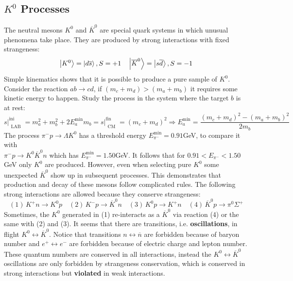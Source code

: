 \documentclass[10.75pt,a4paper,openright,bottom=2cm]{article}
\begin{document}
\subsection{$K^0$ Processes}
The neutral mesons $K^0$ and $\overline{K}^0$ are special quark systems in which unusual phenomena take place. They are produced by strong interactions with fixed strangeness:
\[
\ket{K^0}=\ket{d\overline{s}}, S=+1 \quad \ket{\overline{K}^0}=\ket{s\overline{d}}, S=-1
\]
Simple kinematics shows that it is possible to produce a pure sample of $K^0$. Consider the reaction $ab\to cd$, if $(m_c+m_d)>(m_a+m_b)$ it requires some kinetic energy to happen. Study the process in the system where the target $b$ is at rest:
\[
s\Bigr|_{\substack{\text{LAB}}}^{\text{ini}}=m_a^2+m_b^2+2E_a^{\min} m_b=s\Bigr|_{\substack{\text{CM}}}^{\text{fin}}=(m_c+m_d)^2\Rightarrow E_a^{\min}=\frac{(m_c+m_d)^2-(m_a+m_b)^2}{2m_b}
\]
The process $\pi^- p\to\Lambda K^0$ has a threshold energy $E_{\pi^-}^{\min}=0.91$\;GeV, to compare it with\\
$\pi^- p\to K^0\overline{K}^0n$ which has $E_{\pi^-}^{\min}=1.50$\;GeV. It follows that for $0.91<E_{\pi^-}<1.50$\;GeV only $K^0$ are produced. However, even when selecting pure $K^0$ some unexpected $\overline{K}^0$ show up in subsequent processes. This demonstrates that production and decay of these mesons follow complicated rules. The following strong interactions are allowed because they conserve strangeness:
\[
(1)\,K^+n\to K^0p \quad (2)\,K^-p\to\overline{K}^0n \quad (3)\,K^0p\to K^+n \quad (4)\,\overline{K}^0p\to\pi^0\Sigma^+
\]
Sometimes, the $K^0$ generated in (1) re-interacts as a $\overline{K}^0$ via reaction (4) or the same with (2) and (3). It seems that there are transitions, i.e. \textbf{oscillations}, in flight $K^0\leftrightarrow\overline{K}^0$. Notice that transitions $n\leftrightarrow\overline{n}$ are forbidden because of baryon number and $e^+\leftrightarrow e^-$ are forbidden because of electric charge and lepton number. These quantum numbers are conserved in all interactions, instead the $K^0\leftrightarrow\overline{K}^0$ oscillations are only forbidden by strangeness conservation, which is conserved in strong interactions but \textbf{violated} in weak interactions.
\end{document}
